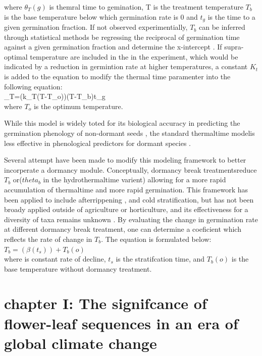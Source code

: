 \documentclass{article}\usepackage[]{graphicx}\usepackage[]{color}
\begin{document}
where $\theta_{T}(g)$ is themral time to gemination, T is the treatment temperature $T_b$ is the base temperature below which germination rate is 0 and $t_g$ is the time to a given germination fraction. If not observed experimentially, $T_b$ can be inferred through statistical methods be regressing the reciprocal of germination time against a given germination fraction and determine the x-intercept \citep{Pritchard1999}.
If supra-optimal temperature are included in the in the experiment, which would be indicated by a reduction in germintion rate at higher temperatures, a constant $K_t$ is added to the equation to modify the thermal time paramenter into the following equation:\\

\theta_{T}=(k_{T}(T-T_{o}))(T-T_{b})t_{g}\\
where $T_o$ is the optimum temperature.
\par While this model is widely toted for its biological accuracy in predicting the germination phenology of non-dormant seeds \citep{Bradford2005}, the standard thermaltime modelis less effective in phenological predictors for dormant species \citep{Batlla2015}.
\par Several attempt have been made to modify this modeling framework to better incorperate a dormancy module. Conceptually, dormancy break treatmentsreduce $T_b$ or($theta_b$ in the hydrothermaltime varient) allowing for a more rapid accumulation of thermaltime and more rapid germination. This framework has been applied to include afterrippening \citep{Meyer2000}, and cold stratification\citep{Pritchard1996,Batlla2003}, but has not been broady applied outside of agriculture or horticulture, and its effectiveness for a diversity of taxa remains unknown \citep{Steadman2004}. By evaluating the change in germination rate at different dormancy break treatment, one can determine a coeficient which reflects the rate of change in $T_b$. The equation is formulated below:\\

$T_b= (\beta(t_s))+T_b(o)$\\
where \beta is constant rate of decline, $t_s$ is the stratifcation time, and $T_b(o)$ is the base temperature without dormancy treatment.

\section*{chapter I: The signifcance of flower-leaf sequences in an era of global climate change}
\end{document}

